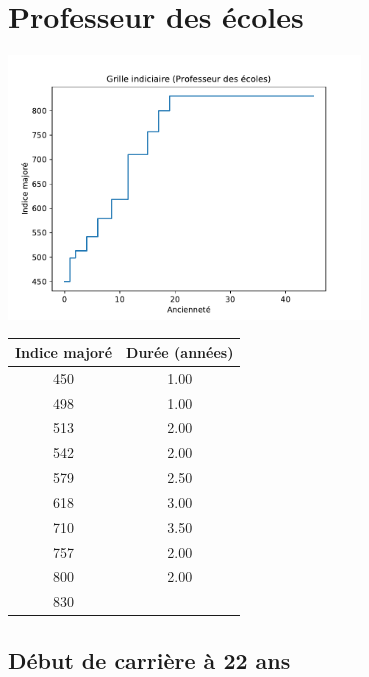\newpage 
 
\chapter{Professeur des écoles} 

\begin{minipage}{0.55\linewidth}\includegraphics[width=0.7\textwidth]{fig/grille_ProfEcoles.pdf}\end{minipage} 
\begin{minipage}{0.3\linewidth} 
 \begin{center} 

\begin{tabular}[htb]{|c|c|} 
\hline 
 Indice majoré &  Durée (années) \\ 
\hline \hline 
 450 &  1.00 \\ 
\hline 
 498 &  1.00 \\ 
\hline 
 513 &  2.00 \\ 
\hline 
 542 &  2.00 \\ 
\hline 
 579 &  2.50 \\ 
\hline 
 618 &  3.00 \\ 
\hline 
 710 &  3.50 \\ 
\hline 
 757 &  2.00 \\ 
\hline 
 800 &  2.00 \\ 
\hline 
 830 &   \\ 
\hline 
\hline 
\end{tabular} 
\end{center} 
 \end{minipage} 


 \addto{\captionsenglish}{ \renewcommand{\mtctitle}{}} \setcounter{minitocdepth}{2} 
 \minitoc \newpage 

\section{Début de carrière à 22 ans} 

